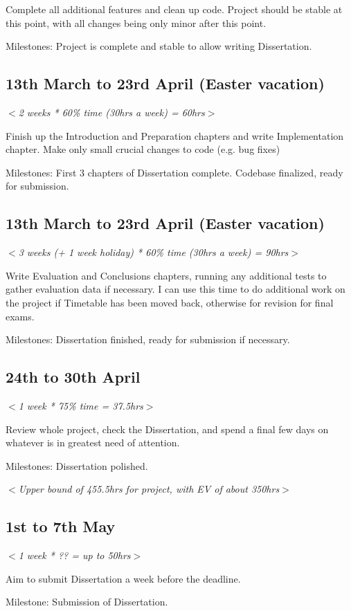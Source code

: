 \documentclass[UKenglish, 12pt]{article}
\newcommand{\al}{$<$}
\newcommand{\ar}{$>$}
\begin{document}
Complete all additional features and clean up code. Project should be stable
at this point, with all changes being only minor after this point.

Milestones: Project is complete and stable to allow writing Dissertation.

\subsection*{13th March to 23rd April (Easter vacation)}
\al\emph{2 weeks * 60\% time (30hrs a week) = 60hrs}\ar

Finish up the Introduction and Preparation chapters and write Implementation
chapter. Make only small crucial changes to code (e.g. bug fixes)

Milestones: First 3 chapters of Dissertation complete. Codebase finalized,
ready for submission. 

\subsection*{13th March to 23rd April (Easter vacation)}
\al\emph{3 weeks (+ 1 week holiday) * 60\% time (30hrs a week) = 90hrs}\ar

Write Evaluation and Conclusions chapters, running any additional tests to gather
evaluation data if necessary. I can use this time to do additional work on the
project if Timetable has been moved back, otherwise for revision for final exams.

Milestones: Dissertation finished, ready for submission if necessary.

\subsection*{24th to 30th April}
\al\emph{1 week * 75\% time = 37.5hrs}\ar

Review whole project, check the Dissertation, and spend a final few
days on whatever is in greatest need of attention.

Milestones: Dissertation polished.

\al\emph{Upper bound of 455.5hrs for project, with EV of about 350hrs}\ar


\subsection*{1st to 7th May}
\al\emph{1 week * ?? = up to 50hrs}\ar

Aim to submit Dissertation a week before the deadline.

Milestone: Submission of Dissertation.
\end{document}
